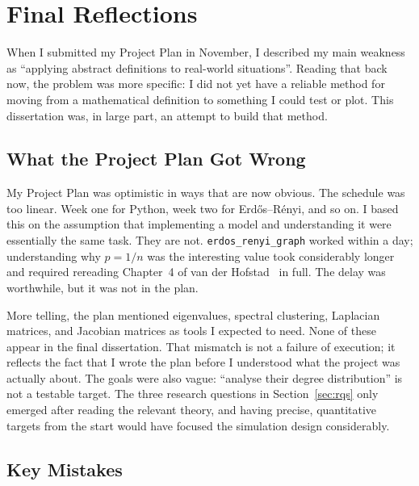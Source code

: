 \documentclass[12pt, a4paper]{report}
\theoremstyle{definition}
\theoremstyle{plain}
\theoremstyle{remark}
\begin{document}
\chapter*{Final Reflections}
\label{chap:reflections}

When I submitted my Project Plan in November, I described my main weakness as
``applying abstract definitions to real-world situations''. Reading that back now,
the problem was more specific: I did not yet have a reliable method for moving from
a mathematical definition to something I could test or plot. This dissertation
was, in large part, an attempt to build that method.

\section*{What the Project Plan Got Wrong}

My Project Plan was optimistic in ways that are now obvious. The schedule was
too linear. Week one for Python, week two for Erd\H{o}s--R\'enyi, and so
on. I based this on the assumption that implementing a model and understanding it
were essentially the same task. They are not. \texttt{erdos\_renyi\_graph}
worked within a day; understanding why $p = 1/n$ was the interesting value
took considerably longer and required rereading Chapter~4 of van der
Hofstad~\cite{hofstad2017} in full. The delay was worthwhile,
but it was not in the plan.


More telling, the plan mentioned eigenvalues, spectral clustering, Laplacian
matrices, and Jacobian matrices as tools I expected to need. None of these
appear in the final dissertation. That mismatch is not a failure of execution;
it reflects the fact that I wrote the plan before I understood what the project
was actually about. The goals were also vague: ``analyse their degree
distribution'' is not a testable target. The three research questions in
Section~\ref{sec:rqs} only emerged after reading the relevant theory, and
having precise, quantitative targets from the start would have focused the
simulation design considerably.


\section*{Key Mistakes}
\end{document}

